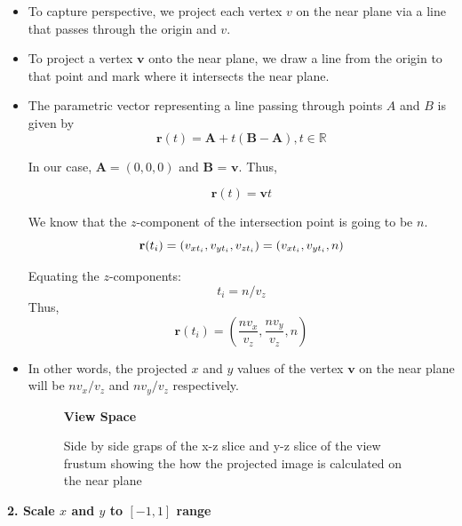 \documentclass{article}
\begin{document}
\begin{itemize}
	\item To capture perspective, we project each vertex $v$ on the near plane via a line that passes through the origin and $v$.
	\item To project a vertex $\textbf{v}$ onto the near plane, we draw a line from the origin to that point and mark where it intersects the near plane.
	\item The parametric vector representing a line passing through points $A$ and $B$ is given by 
\[
	\textbf{r}(t) = \textbf{A} + t(\textbf{B} - \textbf{A}), t \in \mathbb{R}
\]

		In our case, $\textbf{A} = (0,0,0)$ and $\textbf{B}$ = $\textbf{v}$. Thus,

\[
	\textbf{r}(t) = \textbf{v}t
\]

We know that the $z$-component of the intersection point is going to be $n$.
\[
	\textbf{r}(t_i) = (v_{xt_i}, v_{yt_i}, v_{zt_i}) \\
		         = (v_{xt_i}, v_{yt_i}, n)
\]

Equating the $z$-components: 
		\[
			t_i = n/v_z
		\]
Thus,
\[
	\textbf{r}(t_{i}) = \left(\frac{nv_x}{v_z}, \frac{nv_y}{v_z}, n\right)
\]

\item In other words, the projected $x$ and $y$ values of the vertex $\textbf{v}$ on the near plane will be ${nv_x}/{v_z}$ and ${nv_y}/{v_z}$ respectively. 

\begin{figure}[h!]
	\centering%
	\textbf{View Space}\\[0.5em]%
	\begin{subfigure}{0.45\textwidth}
	\resizebox{\textwidth}{!}{%
		
	}\label{fig:2d-frustum-yz}
	\end{subfigure}%
\hfill
	\begin{subfigure}{0.45\textwidth}
	\resizebox{\textwidth}{!}{%
		
	}\label{fig:2d-frustum-xz}
	\end{subfigure}

\caption{Side by side graps of the x-z slice and y-z slice of the view frustum showing the how the projected image is calculated on the near plane}
\end{figure}

\end{itemize}
\textbf{2. Scale $x$ and $y$ to $[-1,1]$ range}
\end{document}
